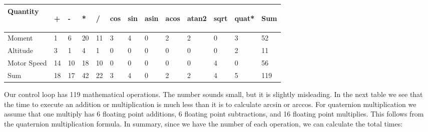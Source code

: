 \documentclass{article}
\numberwithin{equation}{section} %
\begin{document}
\begin{longtable}{l l l l l l l l l l l l l}
Quantity&	
\begin{sideways}+\end{sideways}	&	
\begin{sideways}-\end{sideways}	&	
\begin{sideways}*\end{sideways}	&	
\begin{sideways}/\end{sideways}	&	
\begin{sideways}cos\end{sideways}	&	
\begin{sideways}sin\end{sideways}	&	
\begin{sideways}asin\end{sideways}	&	
\begin{sideways}acos\end{sideways}	&	
\begin{sideways}atan2\end{sideways}	&	
\begin{sideways}sqrt\end{sideways}	&	
\begin{sideways}quat*\end{sideways}	&	
\begin{sideways}Sum\end{sideways}\\
	\hline
Moment	&	1	&	6	&	20	&	11	&	3	&	4	&	0	&	2	&	2	&	0	&	3	&	52 \\
	\hline
Altitude &	3	&	1	&	4	&	1	&	0	&	0	&	0	&	0	&	0	&	0	&	2	&	11	 \\
	\hline
Motor Speed	&	14	&	10	&	18	&	10	&	0	&	0	&	0	&	0	&	0	&	4	&	0	&	56		 \\
	\hline
	Sum	&	18	&	17	&	42	&	22	&	3	&	4	&	0	&	2	&	2	&	4	&	5	&	119	\\
\end{longtable}

Our control loop has 119 mathematical operations. The number sounds small, but it is slightly misleading. In the next table we see that the time to execute an addition or multiplication is much less than it is to calculate arcsin or arccos. For quaternion multiplication we assume that one multiply has 6 floating point additions, 6 floating point subtractions, and 16 floating point multiplies. This follows from the quaternion multiplication formula. In summary, since we have the number of each operation, we can calculate the total times:
\end{document}
